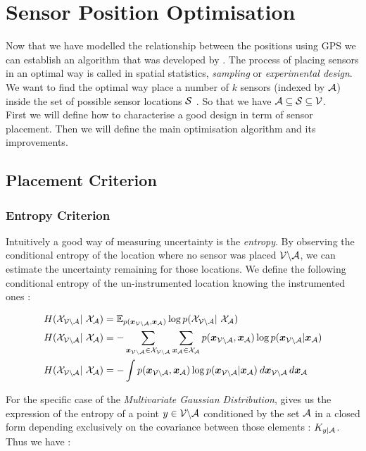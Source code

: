 \documentclass[12pt,twoside]{report}
\begin{document}
 

\section{Sensor Position Optimisation}

Now that we have modelled the relationship between the positions using GPS we can establish an algorithm that was developed by \citet{krause_near-optimal_2008}. The process of placing sensors in an optimal way is called in spatial statistics, \textit{sampling} or \textit{experimental design}. We want to find the optimal way place a number of $k$ sensors (indexed by $\A$) inside the set of possible sensor locations $\S$ . So that we have $\A \subseteq \S \subseteq \V$. \\

First we will define how to characterise a good design in term of sensor placement. Then we will define the main optimisation algorithm and its improvements.

\subsection{Placement Criterion}

\subsubsection{Entropy Criterion}

Intuitively a good way of measuring uncertainty is the \textit{entropy}. By observing the conditional entropy of the location where no sensor was placed $\VA$, we can estimate the uncertainty remaining for those locations. We define the following conditional entropy of the un-instrumented location knowing the instrumented ones \citep[p.~16]{cover_elements_1991} :

\begin{align}
	H(\X_{\VA} | \X_\A) &= \mathbb{E}_{p(\vec{x}_{\VA},\vec{x}_\A)} \log p(\X_{\VA} | \X_\A) \\
	H(\X_{\VA} | \X_\A) &= - \sum_{\vec{x}_{\VA} \in \X_{\VA}}\sum_{\vec{x}_{\A} \in \X_{\A}} p(\vec{x}_{\VA},\vec{x}_\A) \log p(\vec{x}_{\VA}|\vec{x}_\A) \\
	H(\X_{\VA} | \X_\A) &= - \int p(\vec{x}_{\VA},\vec{x}_\A) \log p(\vec{x}_{\VA}|\vec{x}_\A) \: d\vec{x}_{\VA} \, d\vec{x}_\A 
\end{align}

For the specific case of the \textit{Multivariate Gaussian Distribution}, \citet{krause_near-optimal_2008} gives us the expression of the entropy of a point $y \in \VA$ conditioned by the set $\A$ in a closed form depending exclusively on the covariance between those elements : $K_{y | \A}$. Thus we have :  
\end{document}
